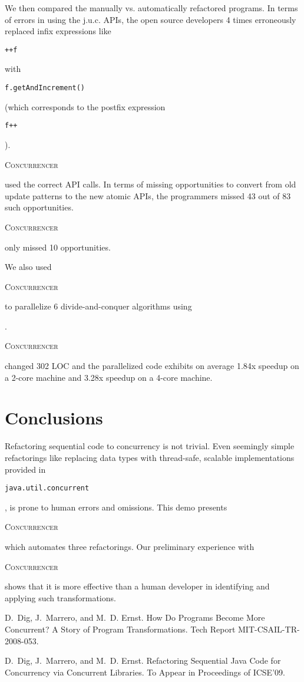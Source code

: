 \documentclass[times,10pt,twocolumn]{article}
\newcommand{\tool}{\begin{scriptsize}\textsc{Concurrencer}\end{scriptsize}\xspace}
\newcommand{\code}[1]{\begin{small}\texttt{#1}\end{small}}
\newcommand{\ConvertToFJTask}{{\begin{scriptsize}\sc{Convert Recursion to FJTask}\end{scriptsize}}\xspace}
\begin{document}
We then compared the manually vs. automatically refactored programs. In terms of
errors in using the {j.u.c.} APIs, the open source developers 4 times
erroneously replaced infix expressions like \code{++f} with
\code{f.getAndIncrement()} (which corresponds to the postfix expression
\code{f++}). \tool used the correct API calls. In terms of missing opportunities
to convert from old update patterns to the new atomic APIs, the programmers
missed 43 out of 83 such opportunities. \tool only missed 10 opportunities.


We also used \tool to parallelize 6 divide-and-conquer algorithms using
\ConvertToFJTask. \tool changed 302 LOC and the parallelized code exhibits on
average 1.84x speedup on a 2-core machine and 3.28x speedup on a 4-core
machine.

\section{Conclusions}
Refactoring sequential code to concurrency is not trivial. Even
seemingly simple refactorings like replacing data types with thread-safe,
scalable implementations provided in \code{java.util.concurrent}, is prone to
human errors and omissions. This demo presents \tool which automates three
refactorings. Our preliminary experience with \tool shows that it
is more effective than a human developer in identifying and applying such
transformations.

%

\begin{thebibliography}{10}
\begin{scriptsize}
D.~Dig, J.~Marrero, and M.~D. Ernst.
\newblock How Do Programs Become More Concurrent? {A} Story of Program
  Transformations.
\newblock Tech Report MIT-CSAIL-TR-2008-053.

D.~Dig, J.~Marrero, and M.~D. Ernst.
\newblock Refactoring Sequential Java Code for Concurrency via Concurrent
  Libraries.
\newblock To Appear in Proceedings of ICSE'09.
\end{scriptsize}
\end{thebibliography}
\end{document}
